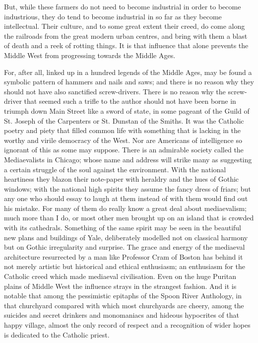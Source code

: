 \documentclass{book}
\begin{document}
But, while these farmers do not need to become industrial in order to become industrious, they do tend to become industrial in so far as they become intellectual. Their culture, and to some great extent their creed, do come along the railroads from the great modern urban centres, and bring with them a blast of death and a reek of rotting things. It is that influence that alone prevents the Middle West from progressing towards the Middle Ages.

For, after all, linked up in a hundred legends of the Middle Ages, may be found a symbolic pattern of hammers and nails and saws; and there is no reason why they should not have also sanctified screw-drivers. There is no reason why the screw-driver that seemed such a trifle to the author should not have been borne in triumph down Main Street like a sword of state, in some pageant of the Guild of St. Joseph of the Carpenters or St. Dunstan of the Smiths. It was the Catholic poetry and piety that filled common life with something that is lacking in the worthy and virile democracy of the West. Nor are Americans of intelligence so ignorant of this as some may suppose. There is an admirable society called the Mediaevalists in Chicago; whose name and address will strike many as suggesting a certain struggle of the soul against the environment. With the national heartiness they blazon their note-paper with heraldry and the hues of Gothic windows; with the national high spirits they assume the fancy dress of friars; but any one who should essay to laugh at them instead of with them would find out his mistake. For many of them do really know a great deal about mediaevalism; much more than I do, or most other men brought up on an island that is crowded with its cathedrals. Something of the same spirit may be seen in the beautiful new plans and buildings of Yale, deliberately modelled not on classical harmony but on Gothic irregularity and surprise. The grace and energy of the mediaeval architecture resurrected by a man like Professor Cram of Boston has behind it not merely artistic but historical and ethical enthusiasm; an enthusiasm for the Catholic creed which made mediaeval civilisation. Even on the huge Puritan plains of Middle West the influence strays in the strangest fashion. And it is notable that among the pessimistic epitaphs of the Spoon River Anthology, in that churchyard compared with which most churchyards are cheery, among the suicides and secret drinkers and monomaniacs and hideous hypocrites of that happy village, almost the only record of respect and a recognition of wider hopes is dedicated to the Catholic priest.
\end{document}
